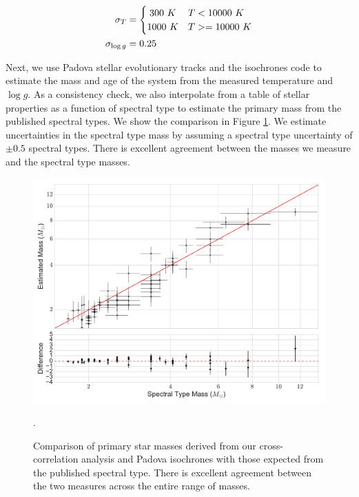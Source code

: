 \documentclass{emulateapj}
\begin{document}
\begin{align}
 \sigma_T &= \begin{cases}
      \hfill 300\ K \hfill & T < 10000\ K \\
      \hfill 1000\ K \hfill & T >= 10000\ K \\
     \end{cases} \\
 \sigma_{\log{g}} &= 0.25
\end{align}

Next, we use Padova stellar evolutionary tracks \citep{Bressan2012} and the isochrones code \citep{isochrones_code} to estimate the mass and age of the system from the measured temperature and $\log{g}$. As a consistency check, we also interpolate from a table of stellar properties as a function of spectral type \citep{Pecaut2013} to estimate the primary mass from the published spectral types. We show the comparison in Figure \ref{fig:prim_mass}. We estimate uncertainties in the spectral type mass by assuming a spectral type uncertainty of $\pm 0.5$ spectral types. There is excellent agreement between the masses we measure and the spectral type masses.

\begin{figure}
\includegraphics[width=\columnwidth]{PrimaryMassEstimates_log.pdf}
\caption{Comparison of primary star masses derived from our cross-correlation analysis and Padova isochrones \citep{Bressan2012} with those expected from the published spectral type. There is excellent agreement between the two measures across the entire range of masses.}
\label{fig:prim_mass}.
\end{figure}
\end{document}
